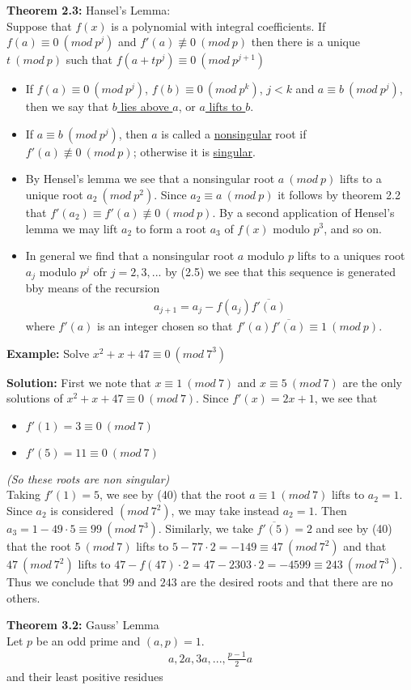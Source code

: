 \documentclass[a4paper]{article}
\begin{document}
\textbf{Theorem 2.3:} Hansel's Lemma:\\
Suppose that $f(x)$ is a polynomial with integral coefficients.
If $f(a)\equiv0\ (mod\ p^j)$ and $f'(a)\not\equiv0\ (mod\ p)$ then there is
a unique $t\ (mod\ p)$ such that $f(a+tp^j)\equiv0\ (mod\ p^{j+1})$

\begin{itemize}
    \item If $f(a)\equiv0\ (mod\ p^j)$, $f(b)\equiv 0\ (mod\ p^k)$, $j<k$ and
    $a\equiv b\ (mod\ p^j)$, then we say that \underline{$b$ lies above $a$}, or
    \underline{$a$ lifts to $b$}.
    \item If $a\equiv b\ (mod\ p^j)$, then $a$ is called a \underline{nonsingular}
    root if $f'(a)\not\equiv 0\ (mod\ p)$; otherwise it is \underline{singular}.
    \item By Hensel's lemma we see that a nonsingular root $a\ (mod\ p)$ lifts
    to a unique root $a_2\ (mod\ p^2)$. Since $a_2\equiv a\ (mod\ p)$ it follows
    by theorem 2.2 that $f'(a_2)\equiv f'(a)\not\equiv 0\ (mod\ p)$. By a second
    application of Hensel's lemma we may lift $a_2$ to form a root $a_3$ of $f(x)$
    modulo $p^3$, and so on.
    \item In general we find that a nonsingular root $a$ modulo $p$ lifts to a
    uniques root $a_j$ modulo $p^j$ ofr $j=2,3,...$ by (2.5) we see that this
    sequence is generated bby means of the recursion
    \begin{align}
        a_{j+1} = a_j-f(a_j)\overline{f'(a)}
    \end{align}
    where $f'(a)$ is an integer chosen so that
    $f'(a)\overline{f'(a)}\equiv 1\ (mod\ p)$.
\end{itemize}

\textbf{Example:}
Solve $x^2+x+47\equiv 0\ (mod\ 7^3)$

\textbf{Solution:}
First we note that $x\equiv 1\ (mod\ 7)$ and $x\equiv 5\ (mod\ 7)$ are the only
solutions of $x^2+x+47\equiv 0\ (mod\ 7)$. Since $f'(x)=2x+1$, we see that
\begin{itemize}
    \item $f'(1)=3\equiv 0\ (mod\ 7)$
    \item $f'(5)=11\equiv 0\ (mod\ 7)$
\end{itemize}
\textit{(So these roots are non singular)}\\
Taking $f'(1)=5$, we see by (40) that the root $a\equiv 1\ (mod\ 7)$ lifts to
$a_2=1$. Since $a_2$ is considered $(mod\ 7^2)$, we may take instead $a_2=1$.
Then $a_3=1-49\cdot5\equiv 99\ (mod\ 7^3)$. Similarly, we take $\overline{f'(5)}=2$
and see by (40) that the root $5\ (mod\ 7)$ lifts to
$5-77\cdot2=-149\equiv 47\ (mod\ 7^2)$ and that $47\ (mod\ 7^2)$ lifts to
$47-f(47)\cdot2=47-2303\cdot2=-4599\equiv 243\ (mod\ 7^3)$.
Thus we conclude that $99$ and $243$ are the desired roots and that there are
no others.


\textbf{Theorem 3.2:} Gauss' Lemma\\
Let $p$ be an odd prime and $(a,p)=1$.
\begin{align}
    a,2a,3a,...,\frac{p-1}{2}a
\end{align}
and their least positive residues
\end{document}
